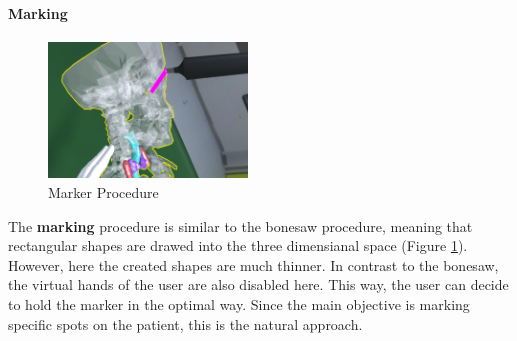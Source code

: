 \paragraph{Marking}

\begin{figure}[ht]
    \centering
    \includegraphics[width=200px]{images/implementation/features/procedures/marker.png}
    \caption{\label{fig::FeatureMarker}Marker Procedure}
\end{figure}

The \textbf{marking} procedure is similar to the bonesaw procedure, meaning that rectangular shapes are drawed into the three dimensianal space (Figure \ref{fig::FeatureMarker}).
However, here the created shapes are much thinner.
In contrast to the bonesaw, the virtual hands of the user are also disabled here.
This way, the user can decide to hold the marker in the optimal way.
Since the main objective is marking specific spots on the patient, this is the natural approach.